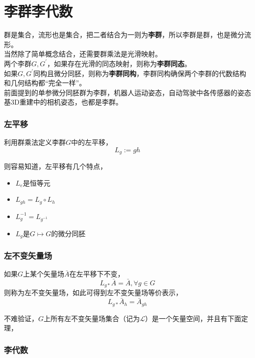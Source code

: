 \section{李群李代数}

群是集合，流形也是集合，把二者结合为一则为\textbf{李群}，所以李群是群，也是微分流形。\\

当然除了简单概念结合，还需要群乘法是光滑映射。\\

两个李群$G,G^\prime$，如果存在光滑的同态映射，则称为\textbf{李群同态}。\\

如果$G,G^\prime$同构且微分同胚，则称为\textbf{李群同构}，李群同构确保两个李群的代数结构和几何结构都“完全一样”。\\

前面提到的单参微分同胚群为李群，机器人运动姿态，自动驾驶中各传感器的姿态基3D重建中的相机姿态，也都是李群。

\subsubsection*{左平移}
利用群乘法定义李群$G$中的左平移，
$$
	L_g:= gh
$$

则容易知道，左平移有几个特点，
\begin{itemize}
	\item $L_e$是恒等元
	\item $L_{gh} = L_g\circ L_h$
	\item $L_g^{-1} = L_{g^{-1}}$
	\item $L_g$是$G\mapsto G$的微分同胚
\end{itemize}

\subsubsection*{左不变矢量场}

	如果$G$上某个矢量场$\bar{A}$在左平移下不变，
	$$
		L_{g*} \bar{A} = \bar{A}, \forall g \in G
	$$
	则称为左不变矢量场，如此可得到左不变矢量场等价表示，
	$$
		 L_{g*}\bar{A}_h = \bar{A}_{gh}
	$$

	不难验证，$G$上所有左不变矢量场集合（记为$\mathcal{L}$）是一个矢量空间，并且有下面定理，




\subsubsection*{李代数}

